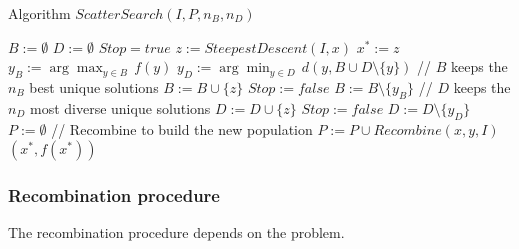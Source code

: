 \documentclass[11pt]{article}
\begin{document}
	\newpage
	
	\begin{algorithm}[H]
		\caption{Algorithm $ScatterSearch(I , P, n_B , n_D)$}
		\begin{algorithmic}
			\STATE $B := \emptyset$ 
			\STATE $D := \emptyset$
			\REPEAT
				\STATE $Stop = true$
					\STATE $z := SteepestDescent(I , x)$
						\STATE $x^\ast := z$
					\ENDIF
					\STATE $y_B := \arg \max_{y \in B} \, f(y)$
					\STATE $y_D := \arg \min_{y \in D} \, d (y , B \cup D \setminus \{y \})$
						\STATE // $B$ keeps the $n_B$ best unique solutions
						\STATE $B := B \cup \{z\}$
						\STATE $Stop := false$ 
						\IF{$|B| > n_B$} 
							\STATE $B := B \setminus \{y_B \}$
						\ENDIF
					\ELSE 
							\STATE // $D$ keeps the $n_D$ most diverse unique solutions
							\STATE $D := D \cup \{z\}$ 
							\STATE $Stop := false$ 
							\IF{$|D| > n_D$} 
								\STATE $D := D \setminus \{y_D \}$
							\ENDIF
						\ENDIF
					\ENDIF
				\ENDFOR
				\STATE $P := \emptyset$
					\STATE // Recombine to build the new population
					\STATE $P := P \cup Recombine(x, y , I )$
				\ENDFOR
			\RETURN $(x^\ast, f (x^\ast))$
		\end{algorithmic}
	\end{algorithm}
	
	\newpage
	
	\subsubsection{Recombination procedure}
	The recombination procedure depends on the problem.\\
	
\end{document}
